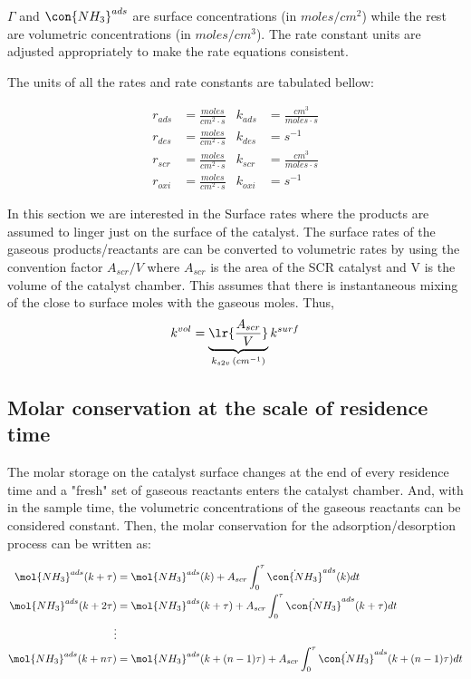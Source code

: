  $\Gamma$ and $\con{NH_3}^{ads}$ are surface concentrations (in
$moles/cm^2$) while the rest are volumetric concentrations (in $moles/cm^3$).
The rate constant units are adjusted appropriately to make the rate equations consistent.

The units of all the rates and rate constants are tabulated bellow:

\begin{align*}
    r_{ads} &= \frac{moles}{cm^2 \cdot s} &
    k_{ads} &= \frac{cm^3}{moles \cdot s} \\
    r_{des} &= \frac{moles}{cm^2 \cdot s} &
    k_{des} &= s^{-1} \\
    r_{scr} &= \frac{moles}{cm^2 \cdot s} &
    k_{scr} &= \frac{cm^3}{moles \cdot s} \\
    r_{oxi} &= \frac{moles}{cm^2 \cdot s} &
    k_{oxi} &= s^{-1}
\end{align*}


In this section we are interested in the Surface rates where the
products are assumed to linger just on the surface of the catalyst. The surface
rates of the gaseous products/reactants are can be converted to volumetric
rates by using the convention factor $A_{scr}/V$ where $A_{scr}$ is the area of
the SCR catalyst and V is the volume of the catalyst chamber. This assumes that
there is instantaneous mixing of the close to  surface moles with the gaseous
moles. Thus,
\begin{align}
    k^{vol} = \underbrace{\lr{\frac{A_{scr}}{V}}}_{k_{s2v} \, (cm^{-1})} k^{surf}
\end{align}


\subsection{Molar conservation at the scale of residence time}

The molar storage on the catalyst surface changes at the end of every residence
time and a "fresh" set of gaseous reactants enters the catalyst chamber. And,
with in the sample time, the volumetric concentrations of the gaseous reactants
can be considered constant.  Then, the molar conservation for the adsorption/desorption process
can be written as:

\begin{align*}
    \mol{NH_3}^{ads} (k + \tau) &= \mol{NH_3}^{ads} (k) + A_{scr} \int_{0}^{\tau} \dot{\con{NH_3}}^{ads} (k) dt\\
    \mol{NH_3}^{ads} (k + 2\tau) &= \mol{NH_3}^{ads} (k + \tau) + A_{scr} \int_{0}^{\tau} \dot{\con{NH_3}}^{ads} (k + \tau) dt\\
    \vdots&\\
    \mol{NH_3}^{ads} (k + n\tau) &= \mol{NH_3}^{ads} (k + (n-1)\tau) + A_{scr} \int_{0}^{\tau} \dot{\con{NH_3}}^{ads} (k + (n-1)\tau) dt
\end{align*}

